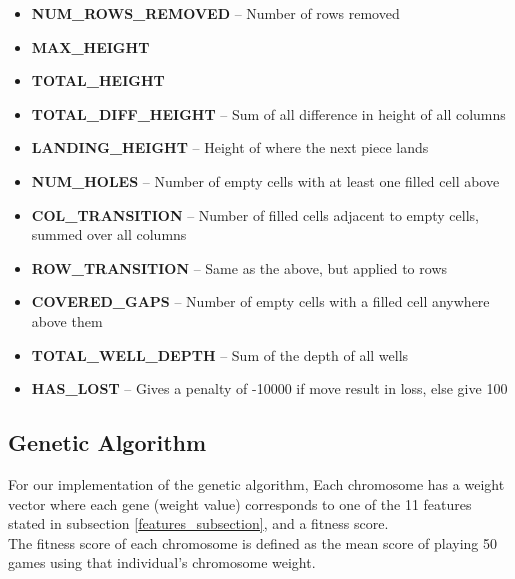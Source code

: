 \documentclass[a4paper,12pt,twocolumn]{article}
\begin{document}
\begin{itemize}
    \item \textbf{NUM\_ROWS\_REMOVED} -- Number of rows removed
    \item \textbf{MAX\_HEIGHT}
    \item \textbf{TOTAL\_HEIGHT}
    \item \textbf{TOTAL\_DIFF\_HEIGHT} -- Sum of all difference in height of all columns
    \item \textbf{LANDING\_HEIGHT} -- Height of where the next piece lands
    \item \textbf{NUM\_HOLES} -- Number of empty cells with at least one filled cell above
    \item \textbf{COL\_TRANSITION} -- Number of filled cells adjacent to empty cells,
        summed over all columns
    \item \textbf{ROW\_TRANSITION} -- Same as the above, but applied to rows
    \item \textbf{COVERED\_GAPS} -- Number of empty cells with a filled cell
        anywhere above them
    \item \textbf{TOTAL\_WELL\_DEPTH} -- Sum of the depth of all wells
    \item \textbf{HAS\_LOST} -- Gives a penalty of -10000 if move result in loss,
        else give 100
\end{itemize}

\subsection{Genetic Algorithm}
For our implementation of the genetic algorithm, Each chromosome has a weight
vector where each gene (weight value) corresponds to one of the 11 features
stated in subsection \ref{features_subsection}, and a fitness score.\\


The fitness score of each chromosome is defined as the mean score of playing 50
games using that individual's chromosome weight.\\
\end{document}
